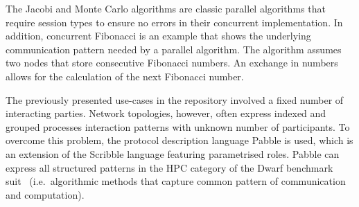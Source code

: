 The Jacobi and Monte Carlo algorithms are classic parallel algorithms
that require session types to ensure no errors in their
concurrent implementation.
%
In addition, concurrent Fibonacci is an
example that shows the underlying communication
pattern needed by a parallel algorithm.
The algorithm assumes two nodes that store
consecutive Fibonacci numbers. An exchange
in numbers allows for the calculation of the
next Fibonacci number.





The previously presented use-cases in the repository
involved a fixed number of interacting parties.
Network topologies, however, often express indexed and grouped processes interaction patterns with unknown number of participants. To overcome this problem, the protocol description
language Pabble is used, which is an extension
of the Scribble language featuring parametrised
roles.
Pabble can express all structured patterns in the
HPC category of the Dwarf benchmark
suit~\cite{BerkleyPar} (i.e.~algorithmic methods that capture common pattern of
communication and computation).


